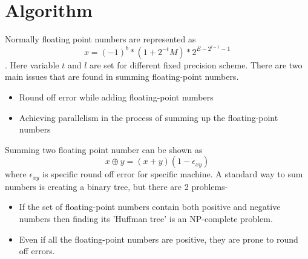\documentclass[11pt]{article}       %
\begin{document}
\section{Algorithm} \label{algo}

Normally floating point numbers are represented as $$x=(-1)^{b} * (1+2^{-t}M)*2^{E-2^{l-1}-1}$$. Here variable $t$ and $l$ are set for different fixed precision scheme. There are two main issues that are found in summing floating-point numbers.

\begin{itemize}
	\item Round off error while adding floating-point numbers
	\item Achieving parallelism in the process of summing up the floating-point numbers
\end{itemize}

Summing two floating point number can be shown as $$x \oplus y = (x+y)(1- \epsilon_{xy})$$ where $\epsilon_{xy}$ is specific round off error for specific machine.
A standard way to sum numbers is creating a binary tree, but there are 2 problems-

\begin{itemize}
	\item If the set of floating-point numbers contain both positive and negative numbers then finding its 'Huffman tree' is an NP-complete problem. \cite{LTALCNS}
	\item Even if all the floating-point numbers are positive, they are prone to round off errors.
\end{itemize}
\end{document}
